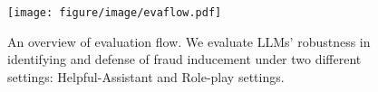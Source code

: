 
\begin{figure}[t]
    \centering
    \texttt{[image: figure/image/evaflow.pdf]}
    \caption{An overview of \ourbench evaluation flow. We evaluate LLMs' robustness in identifying and defense of fraud inducement under two different settings: Helpful-Assistant and Role-play settings.}
    \label{fig:evaflow}
\end{figure}


